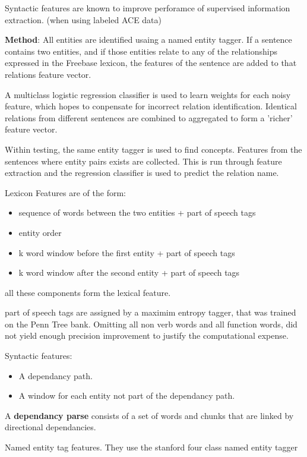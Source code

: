 \documentclass{ecmm427_assignment}
\begin{document}
Syntactic features are known to improve perforamce of supervised information extraction. (when using labeled ACE data)

\textbf{Method}: All entities are identified usaing a named entity tagger. If a sentence contains two entities, and if those entities relate to any of the relationships expressed in the Freebase lexicon, the features of the sentence are added to that relations feature vector.

A multiclass logistic regression classifier is used to learn weights for each noisy feature, which hopes to conpensate for incorrect relation identification. Identical relations from different sentences are combined to aggregated to form a 'richer' feature vector.

Within testing, the same entity tagger is used to find concepts. Features from the sentences where entity pairs exists are collected. This is run through feature extraction and the regression classifier is used to predict the relation name.

Lexicon Features are of the form:
\begin{itemize}
\item sequence of words between the two entities + part of speech tags
\item entity order
\item k word window before the first entity + part of speech tags
\item k word window after the second entity + part of speech tags
\end{itemize}

all these components form the lexical feature.

part of speech tags are assigned by a maximim entropy tagger, that was trained on the Penn Tree bank. Omitting all non verb words and all function words, did not yield enough precision improvement to justify the computational expense.

Syntactic features:
\begin{itemize}
\item A dependancy path.
\item A window for each entity not part of the dependancy path.
\end{itemize}

A \textbf{dependancy parse} consists of a set of words and chunks that are linked by directional dependancies.

Named entity tag features. They use the stanford four class named entity tagger
\end{document}

